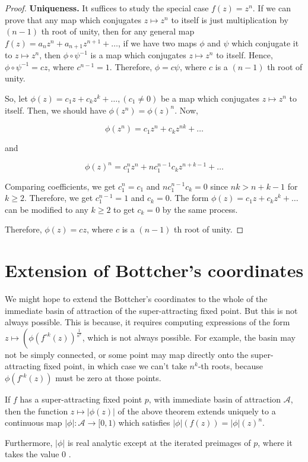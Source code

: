 \begin{proof}
\noindent \textbf{Uniqueness.} It suffices to study the special case $f(z)=z^{n}$. If we can prove that any map which conjugates $z \mapsto z^{n}$ to itself is just multiplication by $(n-1)$ th root of unity, then for any general map $f(z)=a_{n} z^{n}+a_{n+1} z^{n+1}+\ldots$, if we have two maps $\phi$ and $\psi$ which conjugate it to $z \mapsto z^{n}$, then $\phi \circ \psi^{-1}$ is a map which conjugates $z \mapsto z^{n}$ to itself. Hence, $\phi \circ \psi^{-1}=c z$, where $c^{n-1}=1$. Therefore, $\phi=c \psi$, where $c$ is a $(n-1)$ th root of unity.

So, let $\phi(z)=c_{1} z+c_{k} z^{k}+\ldots,\left(c_{1} \neq 0\right)$ be a map which conjugates $z \mapsto z^{n}$ to itself. Then, we should have $\phi\left(z^{n}\right)=\phi(z)^{n}$. Now,

$$
\phi\left(z^{n}\right)=c_{1} z^{n}+c_{k} z^{n k}+\ldots
$$

and

$$
\phi(z)^{n}=c_{1}^{n} z^{n}+n c_{1}^{n-1} c_{k} z^{n+k-1}+\ldots
$$

Comparing coefficients, we get $c_{1}^{n}=c_{1}$ and $n c_{1}^{n-1} c_{k}=0$ since $n k>n+k-1$ for $k \geq 2$. Therefore, we get $c_{1}^{n-1}=1$ and $c_{k}=0$. The form $\phi(z)=c_{1} z+c_{k} z^{k}+\ldots$ can be modified to any $k \geq 2$ to get $c_{k}=0$ by the same process.

Therefore, $\phi(z)=c z$, where $c$ is a $(n-1)$ th root of unity.

	
\end{proof}
\section{Extension of Bottcher's coordinates}
We might hope to extend the Bottcher's coordinates to the whole of the immediate basin of attraction of the super-attracting fixed point. But this is not always possible. This is because, it requires computing expressions of the form $z \mapsto\left(\phi\left(f^{\circ k}(z)\right)^{\frac{1}{n^{k}}}\right.$, which is not always possible. For example, the basin may not be simply connected, or some point may map directly onto the super-attracting fixed point, in which case we can't take $n^{k}$-th roots, because $\phi\left(f^{\circ k}(z)\right)$ must be zero at those points.

\begin{theorem}
If $f$ has a super-attracting fixed point $p$, with immediate basin of attraction $\mathcal{A}$, then the function $z \mapsto|\phi(z)|$ of the above theorem extends uniquely to a continuous map $|\phi|: \mathcal{A} \rightarrow[0,1)$ which satisfies $|\phi|(f(z))=|\phi|(z)^{n}$.

Furthermore, $|\phi|$ is real analytic except at the iterated preimages of $p$, where it takes the value 0 .
\end{theorem}


